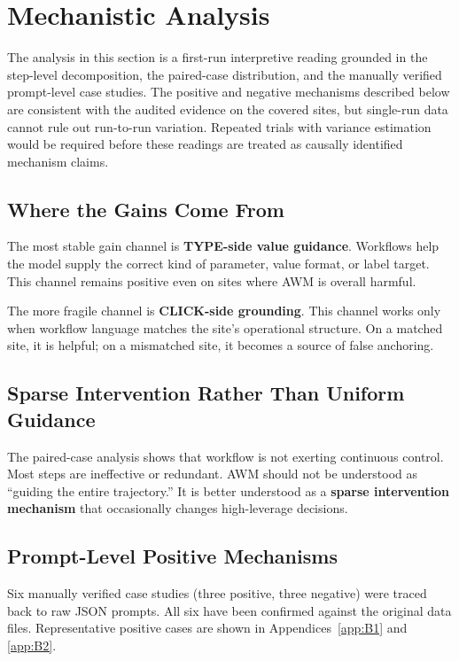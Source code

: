 \documentclass{article}
\begin{document}
\section{Mechanistic Analysis}\label{mechanism-audit}

The analysis in this section is a first-run interpretive reading
grounded in the step-level decomposition, the paired-case distribution,
and the manually verified prompt-level case studies. The positive and
negative mechanisms described below are consistent with the audited
evidence on the covered sites, but single-run data cannot rule out
run-to-run variation. Repeated trials with variance estimation would be
required before these readings are treated as causally identified
mechanism claims.

\subsection{Where the Gains Come
From}\label{where-the-gains-come-from}

The most stable gain channel is \textbf{TYPE-side value guidance}.
Workflows help the model supply the correct kind of parameter, value
format, or label target. This channel remains positive even on sites
where AWM is overall harmful.

The more fragile channel is \textbf{CLICK-side grounding}. This channel
works only when workflow language matches the site's operational
structure. On a matched site, it is helpful; on a mismatched site, it
becomes a source of false anchoring.

\subsection{Sparse Intervention Rather Than Uniform
Guidance}\label{sparse-intervention-rather-than-uniform-guidance}

The paired-case analysis shows that workflow is not exerting continuous
control. Most steps are ineffective or redundant. AWM should not be
understood as ``guiding the entire trajectory.'' It is better understood
as a \textbf{sparse intervention mechanism} that occasionally changes
high-leverage decisions.

\subsection{Prompt-Level Positive
Mechanisms}\label{prompt-level-positive-mechanisms}

Six manually verified case studies (three positive, three negative) were
traced back to raw JSON prompts. All six have been confirmed against the
original data files. Representative positive cases are shown in
Appendices~\ref{app:B1} and \ref{app:B2}.
\end{document}
